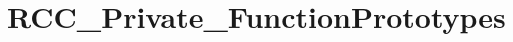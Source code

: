 \hypertarget{group___r_c_c___private___function_prototypes}{\section{R\-C\-C\-\_\-\-Private\-\_\-\-Function\-Prototypes}
\label{group___r_c_c___private___function_prototypes}
}
